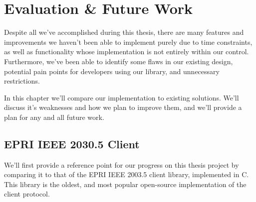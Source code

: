 \chapter{Evaluation \& Future Work}\label{ch:future}
Despite all we've accomplished during this thesis, there are many features and improvements we haven't been able to implement purely due to time constraints, as well as functionality whose implementation is not entirely within our control.
Furthermore, we've been able to identify some flaws in our existing design, potential pain points for developers using our library, and unnecessary restrictions.

In this chapter we'll compare our implementation to existing solutions.
We'll discuss it's weaknesses and how we plan to improve them, and we'll provide a plan for any and all future work.

\section{EPRI IEEE 2030.5 Client}
We'll first provide a reference point for our progress on this thesis project by comparing it to that of the EPRI IEEE 2003.5 client library, implemented in C.
This library is the oldest, and most popular open-source implementation of the client protocol.


